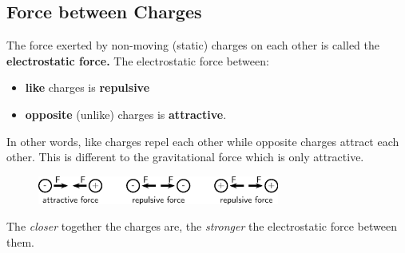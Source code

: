     
    \label{m38780*cid6}
            \subsection{ Force between Charges}
            \nopagebreak
            \label{m38780*id200840}The force exerted by non-moving (static) charges on each other is called the \textbf{electrostatic force.} The electrostatic force between:\par 
      \label{m38780*id200849}\begin{itemize}[noitemsep]
            \label{m38780*uid1}\item \textbf{like} charges is \textbf{repulsive}\label{m38780*uid2}\item \textbf{opposite} (unlike) charges is \textbf{attractive}.
\end{itemize}
        
      \label{m38780*id200894}In other words, like charges repel each other while opposite
charges attract each other. This is different to the gravitational force which is only attractive.\par 
      \label{m38780*id200898}
    \setcounter{subfigure}{0}


	\begin{figure}[H] %
    \begin{center}
    \label{m38780*id200901!!!underscore!!!media}\label{m38780*id200901!!!underscore!!!printimage}\includegraphics[width=300px]{col11305.imgs/m38780_PG10C8_004.png} %
        
      \vspace{2pt}
    \vspace{.1in}
    
    \end{center}

 \end{figure}   

    \addtocounter{footnote}{-0}
    
      \par 
      \label{m38780*id200907}The \textsl{closer} together the charges are, the \textsl{stronger} the electrostatic force between them.\par 
      \label{m38780*id200921}
        
    \setcounter{subfigure}{0}


